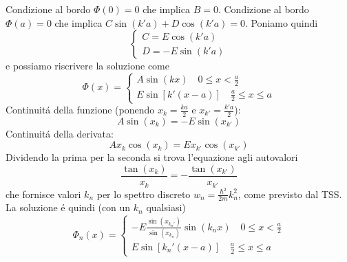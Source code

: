\documentclass[a4paper]{article}
\begin{document}
        Condizione al bordo $\Phi(0)=0$ che implica $B=0$.
        Condizione al bordo $\Phi(a)=0$ che implica $C\sin(k'a)+D\cos(k'a)=0$.
        Poniamo quindi
        \begin{equation*}
            \begin{cases}
                C=E\cos(k'a)\\
                D=-E\sin(k'a)
            \end{cases}
        \end{equation*}
        e possiamo riscrivere la soluzione come
        \begin{equation*}
            \Phi(x)=
            \begin{cases}
                A\sin(kx)\quad 0\leq x <\frac{a}{2}\\
                E\sin[k'(x-a)]\quad \frac{a}{2}\leq x \leq a
            \end{cases}
        \end{equation*}
        Continuit\'a della funzione (ponendo $x_k=\frac{ka}{2}$ e $x_{k'}=\frac{k'a}{2}$):
        \begin{equation*}
            A\sin(x_k)=-E\sin(x_{k'})
        \end{equation*}
        Continuit\'a della derivata:
        \begin{equation*}
            Ax_k\cos(x_k)=Ex_{k'}\cos(x_{k'})
        \end{equation*}
        Dividendo la prima per la seconda si trova l'equazione agli autovalori
        \begin{equation*}
            \frac{\tan(x_k)}{x_k}=-\frac{\tan(x_{k'})}{x_{k'}}
        \end{equation*}
        che fornisce valori $k_n$ per lo spettro discreto $w_n=\frac{\hbar^2}{2m}k_n^2$, come previsto dal TSS.
        La soluzione \'e quindi (con un $k_n$ qualsiasi)
        \begin{equation*}
            \Phi_n(x)=
            \begin{cases}
                -E\frac{\sin(x_{k_n'})}{\sin(x_{k_n})}\sin(k_nx)\quad 0\leq x <\frac{a}{2}\\
                E\sin[k_n'(x-a)]\quad \frac{a}{2}\leq x \leq a
            \end{cases}
        \end{equation*}
        \begin{figure}[H]
            \centering
        \end{figure}
\end{document}
